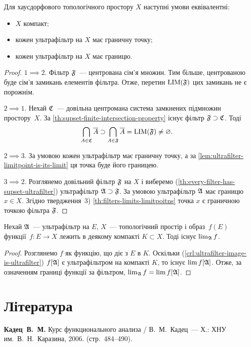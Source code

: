 \begin{theorem}
    Для хаусдорфового топологічного простору $X$ наступні умови еквівалентні:
    \begin{itemize}
        \item $X$ компакт;
        \item кожен ультрафільтр на $X$ має граничну точку;
        \item кожен ультрафільтр на $X$ має границю.
    \end{itemize}
\end{theorem}
\begin{proof}
    $1 \implies 2$. Фільтр $\frak F$~--- центрована сім'я множин. Тим більше, центрованою буде сім'я замикань елементів фільтра. Отже, перетин $\LIM(\frak F)$ цих замикань не є порожнім. 
    
    $2 \implies 1$. Нехай $\frak C$~--- довільна центромана система замкнених підмножин простору~$X$. За \cref{th:supset-finite-intersection-property} існує фільтр $\frak F \supset \frak C$. Тоді
    \begin{equation*}
        \bigcap_{A \in \frak C} \closure A \supset \bigcap_{A \in \frak F} \closure A = \LIM(\frak F) \ne \emptyset.
    \end{equation*}
    
    $2 \implies 3$. За умовою кожен ультрафільтр має граничну точку, а за \cref{lem:ultrafilter-limitpoint-is-its-limit} ця точка буде його границею. 
    
    $3 \implies 2$. Розглянемо довільний фільтр $\frak F$ на $X$ і виберемо (\cref{th:every-filter-has-supset-ultrafilter}) ультрафільтр $\frak A \supset \frak F$. За умовою ультрафільтр $\frak A$ має границю $x \in X$. Згідно твердження~3) \cref{th:filters-limits-limitpoitns} точка $x$ є граничною точкою фільтра $\frak F$.
\end{proof}

\begin{corollary}
    Нехай $\frak A$~--- ультрафільтр на $E$, $X$~--- топологічний простір і образ~$f(E)$ функції~$f: E \to X$ лежить в деякому компакті $K \subset X$. Тоді існує $\lim_{\frak A} f$.
\end{corollary}
\begin{proof}
    Розглянемо $f$ як функцію, що діє з $E$ в $K$. Оскільки (\cref{crl:ultrafilter-image-is-ultrafilter}) $f[\frak A]$ є ультрафільтром на компакті $K$, то існує $\lim f[\frak A]$. Отже, за означенням границі функції за фільтром, $\lim_{\frak A} f = \lim f[\frak A]$.
\end{proof}

\section{Література}

\begin{enumerate}[label={[\arabic*]}]
\item \textbf{Кадец~В.~М.}
Курс функционального анализа /
В.~М.~Кадец~---
Х.: ХНУ им.~В.~Н.~Каразина, 2006. (стр.~484--490).
\end{enumerate}
